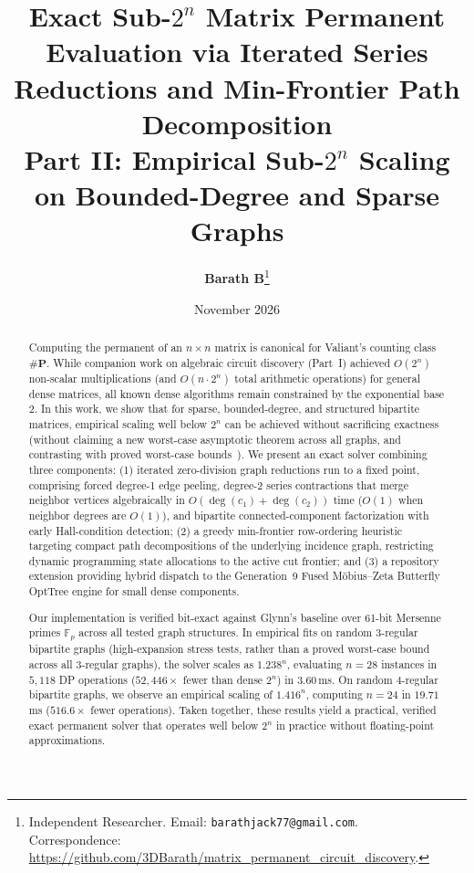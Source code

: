 \documentclass[11pt,a4paper]{article}
\title{%
    \textbf{Exact Sub-$2^n$ Matrix Permanent Evaluation via Iterated Series Reductions and Min-Frontier Path Decomposition}\\[0.4em]
    \large\textsf{Part II: Empirical Sub-$2^n$ Scaling on Bounded-Degree and Sparse Graphs}
}
\author{
    \textbf{Barath B}\thanks{Independent Researcher. Email: \texttt{barathjack77@gmail.com}.\\Correspondence: \url{https://github.com/3DBarath/matrix_permanent_circuit_discovery}.}
}
\date{November 2026}
\theoremstyle{definition}
\newcommand{\F}{\mathbb{F}}
\newcommand{\sharpp}{\#\mathbf{P}}
\begin{document}
\maketitle

\begin{abstract}
Computing the permanent of an $n \times n$ matrix is canonical for Valiant's counting class $\sharpp$. While companion work on algebraic circuit discovery (Part~I) achieved $O(2^n)$ non-scalar multiplications (and $O(n \cdot 2^n)$ total arithmetic operations) for general dense matrices, all known dense algorithms remain constrained by the exponential base $2$. In this work, we show that for sparse, bounded-degree, and structured bipartite matrices, empirical scaling well below $2^n$ can be achieved without sacrificing exactness (without claiming a new worst-case asymptotic theorem across all graphs, and contrasting with proved worst-case bounds~\cite{servediowan2005,fominhoie2006,izumiwadayama2012,bjorklund2012,bjorklund2016}). We present an exact solver combining three components: (1) iterated zero-division graph reductions run to a fixed point, comprising forced degree-1 edge peeling, degree-2 series contractions that merge neighbor vertices algebraically in $O(\deg(c_1)+\deg(c_2))$ time ($O(1)$ when neighbor degrees are $O(1)$), and bipartite connected-component factorization with early Hall-condition detection; (2) a greedy min-frontier row-ordering heuristic targeting compact path decompositions of the underlying incidence graph, restricting dynamic programming state allocations to the active cut frontier; and (3) a repository extension providing hybrid dispatch to the Generation~9 Fused M\"obius--Zeta Butterfly OptTree engine for small dense components.

Our implementation is verified bit-exact against Glynn's baseline over 61-bit Mersenne primes $\F_p$ across all tested graph structures. In empirical fits on random 3-regular bipartite graphs (high-expansion stress tests, rather than a proved worst-case bound across all 3-regular graphs), the solver scales as $1.238^n$, evaluating $n = 28$ instances in $5{,}118$ DP operations ($52{,}446\times$ fewer than dense $2^n$) in $3.60$\,ms. On random 4-regular bipartite graphs, we observe an empirical scaling of $1.416^n$, computing $n = 24$ in $19.71$\,ms ($516.6\times$ fewer operations). Taken together, these results yield a practical, verified exact permanent solver that operates well below $2^n$ in practice without floating-point approximations.
\end{abstract}
\end{document}
